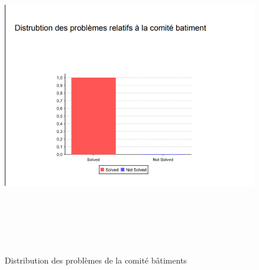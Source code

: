 \documentclass[11.5pt]{report}
\begin{document}
\begin{figure}[h]
	
	\begin{center}
		\includegraphics[width=500pt,height=400pt]{d1.png} 
		\caption{Distribution des problèmes de la comité bâtiments}
	\end{center}
	
\end{figure}
\end{document}
